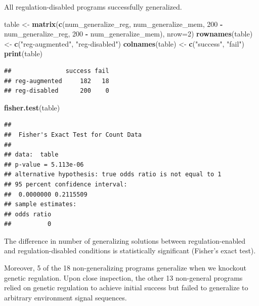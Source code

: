 \documentclass[
]{book}
\newenvironment{Shaded}{\begin{snugshade}}{\end{snugshade}}
\newcommand{\DataTypeTok}[1]{\textcolor[rgb]{0.13,0.29,0.53}{#1}}
\newcommand{\DecValTok}[1]{\textcolor[rgb]{0.00,0.00,0.81}{#1}}
\newcommand{\KeywordTok}[1]{\textcolor[rgb]{0.13,0.29,0.53}{\textbf{#1}}}
\newcommand{\NormalTok}[1]{#1}
\newcommand{\OperatorTok}[1]{\textcolor[rgb]{0.81,0.36,0.00}{\textbf{#1}}}
\newcommand{\StringTok}[1]{\textcolor[rgb]{0.31,0.60,0.02}{#1}}
\begin{document}
All regulation-disabled programs successfully generalized.

\begin{Shaded}
\begin{Highlighting}[]
\NormalTok{table \textless{}{-}}\StringTok{ }\KeywordTok{matrix}\NormalTok{(}\KeywordTok{c}\NormalTok{(num\_generalize\_reg,}
\NormalTok{                  num\_generalize\_mem,}
                  \DecValTok{200} \OperatorTok{{-}}\StringTok{ }\NormalTok{num\_generalize\_reg,}
                  \DecValTok{200} \OperatorTok{{-}}\StringTok{ }\NormalTok{num\_generalize\_mem),}
                \DataTypeTok{nrow=}\DecValTok{2}\NormalTok{)}
\KeywordTok{rownames}\NormalTok{(table) \textless{}{-}}\StringTok{ }\KeywordTok{c}\NormalTok{(}\StringTok{"reg{-}augmented"}\NormalTok{, }\StringTok{"reg{-}disabled"}\NormalTok{)}
\KeywordTok{colnames}\NormalTok{(table) \textless{}{-}}\StringTok{ }\KeywordTok{c}\NormalTok{(}\StringTok{"success"}\NormalTok{, }\StringTok{"fail"}\NormalTok{)}
\KeywordTok{print}\NormalTok{(table)}
\end{Highlighting}
\end{Shaded}

\begin{verbatim}
##               success fail
## reg-augmented     182   18
## reg-disabled      200    0
\end{verbatim}

\begin{Shaded}
\begin{Highlighting}[]
\KeywordTok{fisher.test}\NormalTok{(table)}
\end{Highlighting}
\end{Shaded}

\begin{verbatim}
## 
##  Fisher's Exact Test for Count Data
## 
## data:  table
## p-value = 5.113e-06
## alternative hypothesis: true odds ratio is not equal to 1
## 95 percent confidence interval:
##  0.0000000 0.2115509
## sample estimates:
## odds ratio 
##          0
\end{verbatim}

The difference in number of generalizing solutions between regulation-enabled and regulation-disabled conditions is statistically significant (Fisher's exact test).

Moreover, 5 of the 18 non-generalizing programs generalize when we knockout genetic regulation.
Upon close inspection, the other 13 non-general programs relied on genetic regulation to achieve initial success but failed to generalize to arbitrary environment signal sequences.
\end{document}
